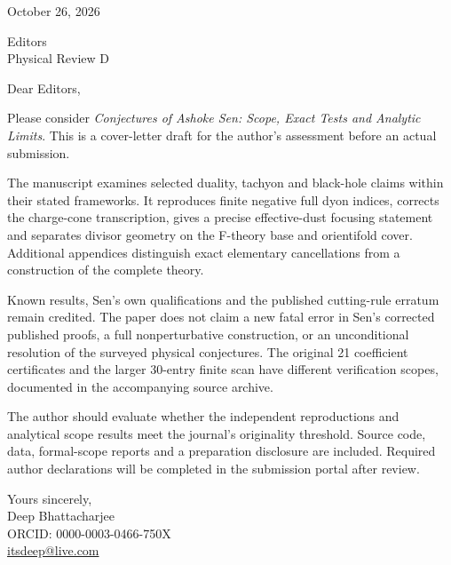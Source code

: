 \documentclass[11pt]{article}
\begin{document}
\noindent October 26, 2026\par\bigskip
\noindent Editors\\Physical Review D\par\bigskip
\noindent Dear Editors,\par\medskip
Please consider \emph{Conjectures of Ashoke Sen: Scope, Exact Tests and Analytic Limits}. This is a cover-letter draft for the author's assessment before an actual submission.

The manuscript examines selected duality, tachyon and black-hole claims within their stated frameworks. It reproduces finite negative full dyon indices, corrects the charge-cone transcription, gives a precise effective-dust focusing statement and separates divisor geometry on the F-theory base and orientifold cover. Additional appendices distinguish exact elementary cancellations from a construction of the complete theory.

Known results, Sen's own qualifications and the published cutting-rule erratum remain credited. The paper does not claim a new fatal error in Sen's corrected published proofs, a full nonperturbative construction, or an unconditional resolution of the surveyed physical conjectures. The original 21 coefficient certificates and the larger 30-entry finite scan have different verification scopes, documented in the accompanying source archive.

The author should evaluate whether the independent reproductions and analytical scope results meet the journal's originality threshold. Source code, data, formal-scope reports and a preparation disclosure are included. Required author declarations will be completed in the submission portal after review.

\bigskip\noindent Yours sincerely,\\Deep Bhattacharjee\\ORCID: 0000-0003-0466-750X\\\href{mailto:itsdeep@live.com}{itsdeep@live.com}
\end{document}
